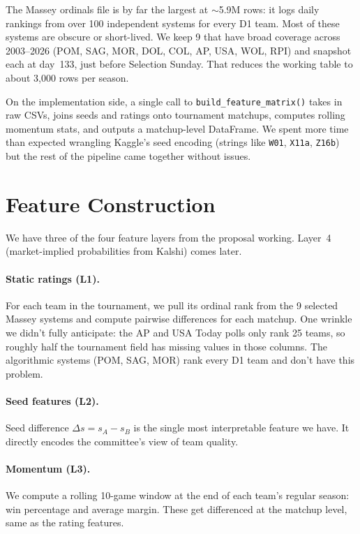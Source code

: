 \documentclass[11pt,a4paper]{article}
\begin{document}
The Massey ordinals file is by far the largest at $\sim$5.9M rows: it logs daily rankings from over 100 independent systems for every D1 team. Most of these systems are obscure or short-lived. We keep 9 that have broad coverage across 2003--2026 (POM, SAG, MOR, DOL, COL, AP, USA, WOL, RPI) and snapshot each at day~133, just before Selection Sunday. That reduces the working table to about 3{,}000 rows per season.

On the implementation side, a single call to \texttt{build\_feature\_matrix()} takes in raw CSVs, joins seeds and ratings onto tournament matchups, computes rolling momentum stats, and outputs a matchup-level DataFrame. We spent more time than expected wrangling Kaggle's seed encoding (strings like \texttt{W01}, \texttt{X11a}, \texttt{Z16b}) but the rest of the pipeline came together without issues.


\section{Feature Construction}

We have three of the four feature layers from the proposal working. Layer~4 (market-implied probabilities from Kalshi) comes later.

\paragraph{Static ratings (L1).} For each team in the tournament, we pull its ordinal rank from the 9 selected Massey systems and compute pairwise differences for each matchup. One wrinkle we didn't fully anticipate: the AP and USA Today polls only rank 25 teams, so roughly half the tournament field has missing values in those columns. The algorithmic systems (POM, SAG, MOR) rank every D1 team and don't have this problem.

\paragraph{Seed features (L2).} Seed difference $\Delta s = s_A - s_B$ is the single most interpretable feature we have. It directly encodes the committee's view of team quality.

\paragraph{Momentum (L3).} We compute a rolling 10-game window at the end of each team's regular season: win percentage and average margin. These get differenced at the matchup level, same as the rating features.
\end{document}
